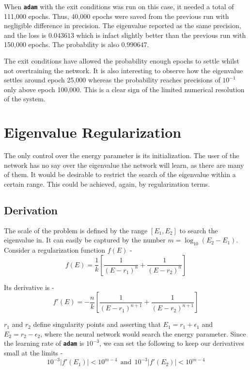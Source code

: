 \documentclass{article}
\newcommand{\oom}[1]{$10^{#1}$}
\newcommand{\adam}{\texttt{\textbf{adam}} }
\begin{document}
\justify
When \adam with the exit conditions was run on this case, it needed a total of 111,000 epochs. Thus, 40,000 epochs were saved from the previous run with negligible difference in precision. The eigenvalue reported as the same precision, and the loss is $0.043613$ which is infact slightly better than the previous run with 150,000 epochs. The probability is also $0.990647$.

\justify
The exit conditions have allowed the probability enough epochs to settle whilst not overtraining the network. It is also interesting to observe how the eigenvalue settles around epoch 25,000 whereas the probability reaches precisions of \oom{-1} only above epoch 100,000. This is a clear sign of the limited numerical resolution of the system.


\section{Eigenvalue Regularization}

\justify
The only control over the energy parameter is its initialization. The user of the network has no say over the eigenvalue the network will learn, as there are many of them. It would be desirable to restrict the search of the eigenvalue within a certain range. This could be achieved, again, by regularization terms.

\subsection{Derivation}

\justify
The scale of the problem is defined by the range $\left[E_1, E_2\right]$ to search the eigenvalue in. It can easily be captured by the number $m = \log_{10}(E_2 - E_1)$. Consider a regularization function $f(E)$ -
$$\displaystyle{
f(E) = \frac{1}{k} \left[
\frac{1}{(E-r_1)^n} + \frac{1}{(E-r_2)^n}
\right]
}$$

\justify
Its derivative is -
$$\displaystyle{
f'(E) = -\frac{n}{k} \left[
\frac{1}{(E-r_1)^{n+1}} + \frac{1}{(E-r_2)^{n+1}}
\right]
}$$

\justify
$r_1$ and $r_2$ define singularity points and asserting that $E_1 = r_1 + \epsilon_1$ and $E_2 = r_2 - \epsilon_2$, where the neural network would search the energy parameter. Since the learning rate of \adam is \oom{-3}, we can set the following to keep our derivatives small at the limits -
$$\displaystyle{
10^{-3} \left| f'(E_1) \right| < 10^{m-4}
\ \ \text{and} \ \ 
10^{-3} \left| f'(E_2) \right| < 10^{m-4}
}
$$
\end{document}

